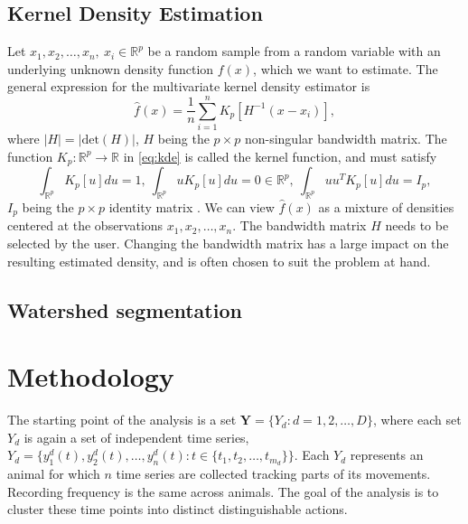 \documentclass[a4paper]{memoir}
\theoremstyle{plain}
\theoremstyle{definition}
\theoremstyle{remark}
\begin{document}
\section{Kernel Density Estimation}
Let $x_1, x_2, \hdots, x_n, \ x_i \in \mathbb{R}^p$ be a random sample from a random variable with an underlying unknown density function $f(x)$, which we want to estimate.
The general expression for the multivariate kernel density estimator is \cite{simonoff}
\begin{equation}\label{eq:kde}
        \hat{f}(x)   = \frac{1}{n} \sum_{i = 1}^{n} K_p \left[ H^{-1}(x - x_i) \right],
\end{equation}
where $|H| = |\text{det} (H)|$, $H$ being the $p \times p$ non-singular bandwidth matrix.
The function $K_p : \mathbb{R}^p \rightarrow \mathbb{R}$ in \eqref{eq:kde} is called the kernel function, and must satisfy
\begin{equation*}
        \int_{\mathbb{R}^p}^{} K_p [u]du = 1, \ \int_{\mathbb{R}^p}^{}uK_p [u]du = 0 \in \mathbb{R}^p, \ \int_{\mathbb{R}^p}^{} u u^T K_p [u]du = I_p,
\end{equation*}
$I_p$ being the $p \times p$ identity matrix \cite{simonoff}.
We can view $\hat{f}(x)$ as a mixture of densities centered at the observations $x_1, x_2, \hdots, x_n$.
The bandwidth matrix $H$ needs to be selected by the user.
Changing the bandwidth matrix has a large impact on the resulting estimated density, and is often chosen to suit the problem at hand.








\section{Watershed segmentation}








\chapter{Methodology}
The starting point of the analysis is a set $\textbf{Y} =  \{ Y_d : d = 1, 2, \hdots, D \}$, where each set $Y_d$ is again a set of independent time series, $Y_d = \{ y_1^d(t), y_2^d(t), \hdots, y_n^d(t): t \in \{t_1, t_2, \hdots, t_{m_d} \} \}$.
Each $Y_d$ represents an animal for which $n$ time series are collected tracking parts of its movements.
Recording frequency is the same across animals.
The goal of the analysis is to cluster these time points into distinct distinguishable actions.
\end{document}
